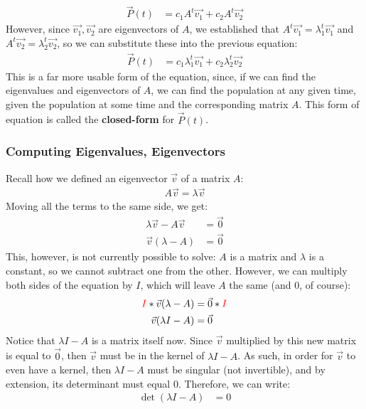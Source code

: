 \documentclass[12pt]{article}
\begin{document}
{\begin{align*}
    \vec{P}(t) &= c_1A^t\vec{v_1} + c_2A^t\vec{v_2}
\end{align*}
However, since $\vec{v_1}, \vec{v_2}$ are eigenvectors of $A$, we established that $A^t\vec{v_1} = \lambda_1^t\vec{v_1}$ and $A^t\vec{v_2} = \lambda_2^t\vec{v_2}$, so we can substitute these into the previous equation:
\begin{align*}
    \vec{P}(t) &= c_1\lambda_1^t\vec{v_1} + c_2\lambda_2^t\vec{v_2}
\end{align*}
This is a far more usable form of the equation, since, if we can find the eigenvalues and eigenvectors of $A$, we can find the population at any given time, given the population at some time and the corresponding matrix $A$. This form of equation is called the \textbf{closed-form} for $\vec{P}(t)$.

\subsubsection{Computing Eigenvalues, Eigenvectors}

Recall how we defined an eigenvector $\vec{v}$ of a matrix $A$:
\begin{align*}
    A\vec{v} = \lambda \vec{v}
\end{align*}
Moving all the terms to the same side, we get:
\begin{align*}
    \lambda \vec{v} - A\vec{v}&= \vec{0}\\
    \vec{v}(\lambda - A) &= \vec{0}
\end{align*}
This, however, is not currently possible to solve: $A$ is a matrix and $\lambda$ is a constant, so we cannot subtract one from the other. However, we can multiply both sides of the equation by $I$, which will leave $A$ the same (and $0$, of course):
\begin{align*}
    \textcolor{red}{I}*\vec{v}(\lambda - A) &= \vec{0}*\textcolor{red}{I}\\
    \vec{v}(\lambda I - A) &= \vec{0}
\end{align*}
Notice that $\lambda I - A$ is a matrix itself now. Since $\vec{v}$ multiplied by this new matrix is equal to $\vec{0}$, then $\vec{v}$ must be in the kernel of $\lambda I - A$. As such, in order for $\vec{v}$ to even have a kernel, then $\lambda I - A$ must be singular (not invertible), and by extension, its determinant must equal $0$. Therefore, we can write:
\begin{align*}
    \det(\lambda I - A) &= 0
\end{align*}

}
\end{document}
